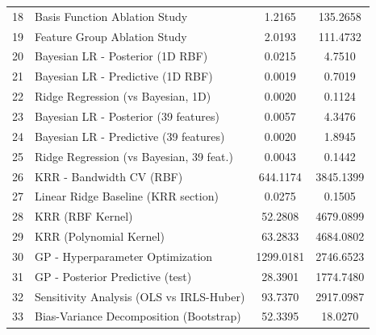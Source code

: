\begin{table}[H]
{\begin{tabular}{|c|l|c|c|}
        18 & Basis Function Ablation Study & 1.2165 & 135.2658 \\
        19 & Feature Group Ablation Study & 2.0193 & 111.4732 \\
        20 & Bayesian LR - Posterior (1D RBF) & 0.0215 & 4.7510 \\
        21 & Bayesian LR - Predictive (1D RBF) & 0.0019 & 0.7019 \\
        22 & Ridge Regression (vs Bayesian, 1D) & 0.0020 & 0.1124 \\
        23 & Bayesian LR - Posterior (39 features) & 0.0057 & 4.3476 \\
        24 & Bayesian LR - Predictive (39 features) & 0.0020 & 1.8945 \\
        25 & Ridge Regression (vs Bayesian, 39 feat.) & 0.0043 & 0.1442 \\
        26 & KRR - Bandwidth CV (RBF) & 644.1174 & 3845.1399 \\
        27 & Linear Ridge Baseline (KRR section) & 0.0275 & 0.1505 \\
        28 & KRR (RBF Kernel) & 52.2808 & 4679.0899 \\
        29 & KRR (Polynomial Kernel) & 63.2833 & 4684.0802 \\
        30 & GP - Hyperparameter Optimization & 1299.0181 & 2746.6523 \\
        31 & GP - Posterior Predictive (test) & 28.3901 & 1774.7480 \\
        32 & Sensitivity Analysis (OLS vs IRLS-Huber) & 93.7370 & 2917.0987 \\
        33 & Bias-Variance Decomposition (Bootstrap) & 52.3395 & 18.0270 \\
        \hline
    \end{tabular}%
    }
\end{table}

